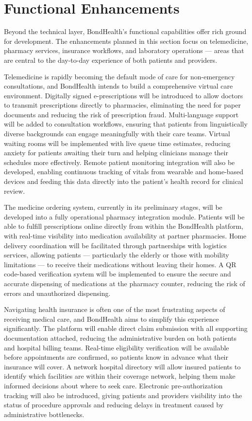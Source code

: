 \section{Functional Enhancements}

\noindent Beyond the technical layer, BondHealth's functional capabilities offer rich ground for development. The enhancements planned in this section focus on telemedicine, pharmacy services, insurance workflows, and laboratory operations --- areas that are central to the day-to-day experience of both patients and providers.

\noindent Telemedicine is rapidly becoming the default mode of care for non-emergency consultations, and BondHealth intends to build a comprehensive virtual care environment. Digitally signed e-prescriptions will be introduced to allow doctors to transmit prescriptions directly to pharmacies, eliminating the need for paper documents and reducing the risk of prescription fraud. Multi-language support will be added to consultation workflows, ensuring that patients from linguistically diverse backgrounds can engage meaningfully with their care teams. Virtual waiting rooms will be implemented with live queue time estimates, reducing anxiety for patients awaiting their turn and helping clinicians manage their schedules more effectively. Remote patient monitoring integration will also be developed, enabling continuous tracking of vitals from wearable and home-based devices and feeding this data directly into the patient's health record for clinical review.

\noindent The medicine ordering system, currently in its preliminary stages, will be developed into a fully operational pharmacy integration module. Patients will be able to fulfill prescriptions online directly from within the BondHealth platform, with real-time visibility into medication availability at partner pharmacies. Home delivery coordination will be facilitated through partnerships with logistics services, allowing patients --- particularly the elderly or those with mobility limitations --- to receive their medications without leaving their homes. A QR code-based verification system will be implemented to ensure the secure and accurate dispensing of medications at the pharmacy counter, reducing the risk of errors and unauthorized dispensing.

\noindent Navigating health insurance is often one of the most frustrating aspects of receiving medical care, and BondHealth aims to simplify this experience significantly. The platform will enable direct claim submission with all supporting documentation attached, reducing the administrative burden on both patients and hospital billing teams. Real-time eligibility verification will be available before appointments are confirmed, so patients know in advance what their insurance will cover. A network hospital directory will allow insured patients to identify which facilities are within their coverage network, helping them make informed decisions about where to seek care. Electronic pre-authorization tracking will also be introduced, giving patients and providers visibility into the status of procedure approvals and reducing delays in treatment caused by administrative bottlenecks.

